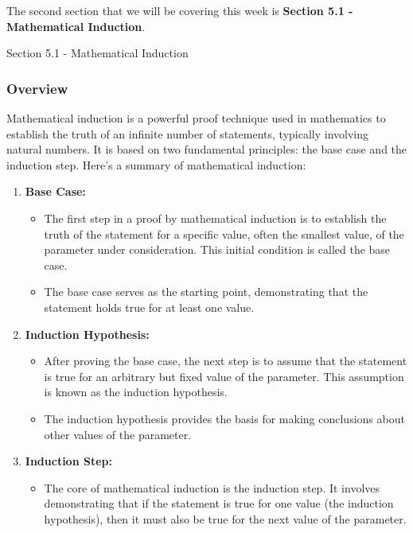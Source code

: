 The second section that we will be covering this week is \textbf{Section 5.1 - Mathematical Induction}.

\begin{notes}{Section 5.1 - Mathematical Induction}
    \subsubsection*{Overview}

    Mathematical induction is a powerful proof technique used in mathematics to establish the truth of an infinite number of statements, typically involving natural numbers. It is based on two fundamental 
    principles: the base case and the induction step. Here's a summary of mathematical induction:

    \begin{enumerate}[label = \arabic*.]
        \item \textbf{Base Case:}
        \begin{itemize}
            \item The first step in a proof by mathematical induction is to establish the truth of the statement for a specific value, often the smallest value, of the parameter under consideration. 
            This initial condition is called the base case.
            \item The base case serves as the starting point, demonstrating that the statement holds true for at least one value.
        \end{itemize}
        \item \textbf{Induction Hypothesis:}
        \begin{itemize}
            \item After proving the base case, the next step is to assume that the statement is true for an arbitrary but fixed value of the parameter. This assumption is known as the induction hypothesis.
            \item The induction hypothesis provides the basis for making conclusions about other values of the parameter.
        \end{itemize}
        \item \textbf{Induction Step:}
        \begin{itemize}
            \item The core of mathematical induction is the induction step. It involves demonstrating that if the statement is true for one value (the induction hypothesis), then it must also be true 
            for the next value of the parameter.

\end{itemize}
\end{enumerate}
\end{notes}
